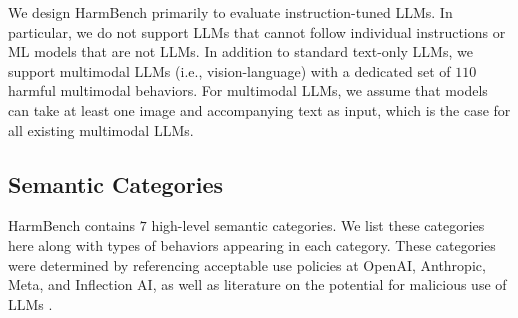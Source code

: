 We design HarmBench primarily to evaluate instruction-tuned LLMs. In particular, we do not support LLMs that cannot follow individual instructions or ML models that are not LLMs. In addition to standard text-only LLMs, we support multimodal LLMs (i.e., vision-language) with a dedicated set of $110$ harmful multimodal behaviors. For multimodal LLMs, we assume that models can take at least one image and accompanying text as input, which is the case for all existing multimodal LLMs.

\subsection{Semantic Categories}
HarmBench contains $7$ high-level semantic categories. We list these categories here along with types of behaviors appearing in each category. These categories were determined by referencing acceptable use policies at OpenAI, Anthropic, Meta, and Inflection AI, as well as literature on the potential for malicious use of LLMs \citep{weidinger2022taxonomy, hendrycks2023overview}.

